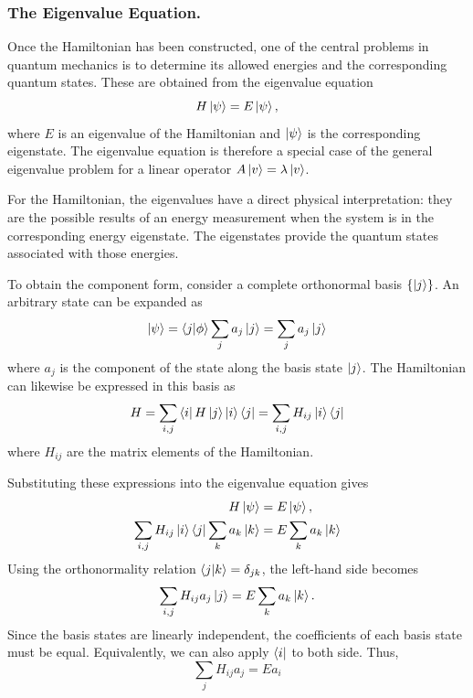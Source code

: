 \documentclass[../../../main.tex]{subfiles}
\begin{document}
\subsubsection{The Eigenvalue Equation.}
Once the Hamiltonian has been constructed, one of the central problems in quantum mechanics is to determine its allowed energies and the corresponding quantum states. 
These are obtained from the eigenvalue equation
\begin{equation*}
    H\ket{\psi}=E\ket{\psi},
    \label{eq:hamiltonian_eigenvalue}
\end{equation*}
where $E$ is an eigenvalue of the Hamiltonian and $\ket{\psi}$ is the corresponding eigenstate. 
The eigenvalue equation is therefore a special case of the general eigenvalue problem for a linear operator $    A\ket{v}=\lambda\ket{v}$.

For the Hamiltonian, the eigenvalues have a direct physical interpretation: they are the possible results of an energy measurement when the system is in the corresponding energy eigenstate. 
The eigenstates provide the quantum states associated with those energies.

To obtain the component form, consider a complete orthonormal basis $\{\ket{j}\}$. 
An arbitrary state can be expanded as
\begin{equation*}
    \ket{\psi} = \braket{j  | \phi} \sum_j a_j\ket{j} = \sum_j a_j\ket{j}
\end{equation*}
where $a_j$ is the component of the state along the basis state $\ket{j}$. 
The Hamiltonian can likewise be expressed in this basis as
\begin{equation*}
    H = \sum_{i,j}\bra{i}H\ket{j}\ket{i}\bra{j} = \sum_{i,j}H_{ij}\ket{i}\bra{j}
\end{equation*}
where $H_{ij}$ are the matrix elements of the Hamiltonian.

Substituting these expressions into the eigenvalue equation gives
\begin{align*}
    H\ket{\psi}
    &=
    E\ket{\psi},
    \\
    \sum_{i,j}H_{ij}\ket{i}\bra{j}
    \sum_k a_k\ket{k}
    &=
    E\sum_k a_k\ket{k}
\end{align*}
Using the orthonormality relation $\braket{j|k}=\delta_{jk}$, the left-hand side becomes
\begin{equation*}
    \sum_{i,j}H_{ij}a_j\ket{j}
    =
    E\sum_k a_k\ket{k}.
\end{equation*}
Since the basis states are linearly independent, the coefficients of each basis state must be equal. 
Equivalently, we can also apply $\bra{i}$ to both side.
Thus,
\begin{equation*}
    \sum_j H_{ij}a_j=Ea_i
\end{equation*}
\end{document}
